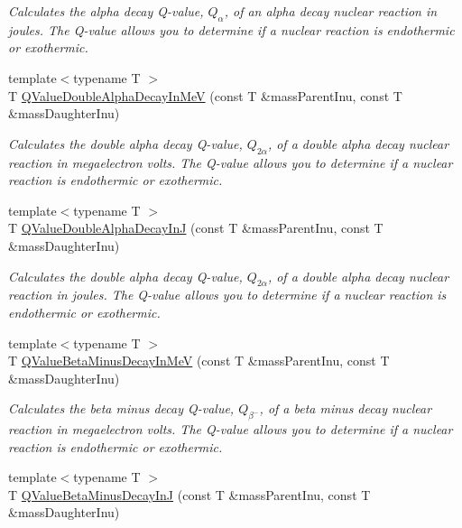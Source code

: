 \begin{DoxyCompactItemize}
\begin{DoxyCompactList}\small\item\em Calculates the alpha decay Q-\/value, $Q_{\alpha}$, of an alpha decay nuclear reaction in joules. The Q-\/value allows you to determine if a nuclear reaction is endothermic or exothermic. \end{DoxyCompactList}\item 
{\footnotesize template$<$typename T $>$ }\\T \hyperlink{group___q_value_ga9bc6e8f493ee3769eb6eea0ac7cbdc61}{Q\+Value\+Double\+Alpha\+Decay\+In\+MeV} (const T \&mass\+Parent\+Inu, const T \&mass\+Daughter\+Inu)
\begin{DoxyCompactList}\small\item\em Calculates the double alpha decay Q-\/value, $Q_{2\alpha}$, of a double alpha decay nuclear reaction in megaelectron volts. The Q-\/value allows you to determine if a nuclear reaction is endothermic or exothermic. \end{DoxyCompactList}\item 
{\footnotesize template$<$typename T $>$ }\\T \hyperlink{group___q_value_gaefd0ecd4ae3166d18a4748ff540e6bfc}{Q\+Value\+Double\+Alpha\+Decay\+InJ} (const T \&mass\+Parent\+Inu, const T \&mass\+Daughter\+Inu)
\begin{DoxyCompactList}\small\item\em Calculates the double alpha decay Q-\/value, $Q_{2\alpha}$, of a double alpha decay nuclear reaction in joules. The Q-\/value allows you to determine if a nuclear reaction is endothermic or exothermic. \end{DoxyCompactList}\item 
{\footnotesize template$<$typename T $>$ }\\T \hyperlink{group___q_value_ga42468e998cf58a027a676755aa1339ba}{Q\+Value\+Beta\+Minus\+Decay\+In\+MeV} (const T \&mass\+Parent\+Inu, const T \&mass\+Daughter\+Inu)
\begin{DoxyCompactList}\small\item\em Calculates the beta minus decay Q-\/value, $Q_{\beta^-}$, of a beta minus decay nuclear reaction in megaelectron volts. The Q-\/value allows you to determine if a nuclear reaction is endothermic or exothermic. \end{DoxyCompactList}\item 
{\footnotesize template$<$typename T $>$ }\\T \hyperlink{group___q_value_ga4a2ab24ffb317abc97ce46c92bb64c3c}{Q\+Value\+Beta\+Minus\+Decay\+InJ} (const T \&mass\+Parent\+Inu, const T \&mass\+Daughter\+Inu)

\end{DoxyCompactItemize}
